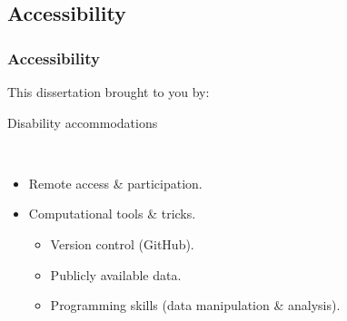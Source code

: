 \documentclass[14pt]{beamer}
\begin{document}
\subsection{Accessibility}
\begin{frame}[t]{}
\frametitle{Accessibility}
\begin{flushright}
This dissertation brought to you by:
\end{flushright}
\begin{Large}
Disability accommodations\\
\end{Large}
~\\
\begin{itemize}
\item Remote access \& participation.\\
\item Computational tools \& tricks.
\begin{itemize}
\item Version control (GitHub).
\item Publicly available data.
\item Programming skills (data manipulation \& analysis).
\end{itemize}
\end{itemize}
\end{frame}
\end{document}
